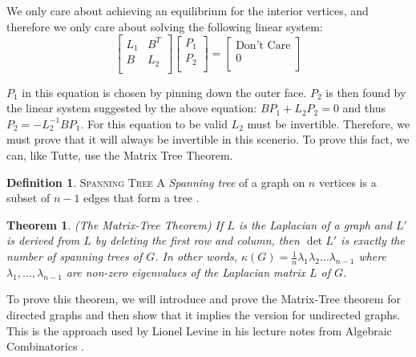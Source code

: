 \documentclass[11pt]{article}
\newtheorem{theorem}{Theorem}[section]
\theoremstyle{definition}
\newtheorem{definition}{Definition}[section]
\begin{document}
	We only care about achieving an equilibrium for the interior vertices, and therefore we only care about solving the following linear system:
		\begin{equation}
			\begin{bmatrix}
				L_1 & B^T \\
				B & L_2 \\
			\end{bmatrix}
			\begin{bmatrix}
			 	P_1 \\
    				P_2 \\
			\end{bmatrix}
			=
			\begin{bmatrix}
				\text{Don't Care} \\
				0 \\
			\end{bmatrix}
		\end{equation}
	
	$P_1$ in this equation is chosen by pinning down the outer face.
	$P_2$ is then found by the linear system suggested by the above equation: $BP_1 + L_2P_2 = 0$ and thus $P_2 = -L_2^{-1}BP_1$. 
	For this equation to be valid $L_2$ must be invertible. Therefore, we must prove that it will always be invertible in this scenerio.
	To prove this fact, we can, like Tutte, use the Matrix Tree Theorem.
	
	\theoremstyle{definition}
	\begin{definition}{\textsc{Spanning Tree}}
		A \emph{Spanning tree} of a graph on $n$ vertices is a subset of $n-1$ edges that form a tree \cite{mathworld:SpanningTree}.
	\end{definition}
	
	\begin{theorem}{(The Matrix-Tree Theorem)}
		If $L$ is the Laplacian of a graph and $L'$ is derived from $L$ by deleting the first row and column, then $\det L'$ is exactly the number of spanning trees of $G$.
		In other words, $\kappa(G) = \frac{1}{n} \lambda_1\lambda_2 \dots \lambda_{n-1}$ where $\lambda_1, \dots, \lambda_{n-1}$ are non-zero eigenvalues of the Laplacian matrix $L$ of $G$.
	\end{theorem}
	
	To prove this theorem, we will introduce and prove the Matrix-Tree theorem for directed graphs and then show that it implies the version for undirected graphs.
	This is the approach used by Lionel Levine in his lecture notes from Algebraic Combinatorics \cite{matrixTree}.
	
\end{document}
